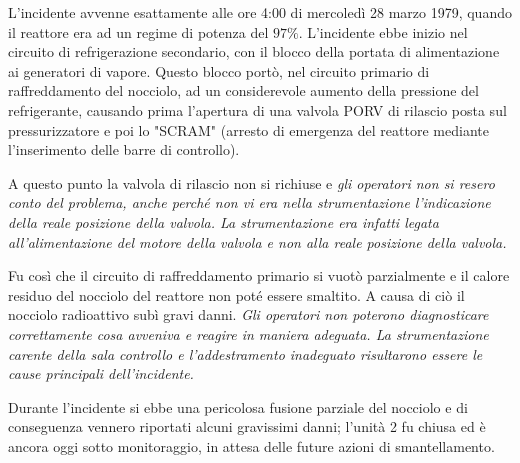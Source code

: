 L'incidente avvenne esattamente alle ore 4:00 di mercoledì 28 marzo 1979, quando il reattore era ad un regime di potenza del $97\%$. L'incidente ebbe inizio nel circuito di refrigerazione secondario, con il blocco della portata di alimentazione ai generatori di vapore. Questo blocco portò, nel circuito primario di raffreddamento del nocciolo, ad un considerevole aumento della pressione del refrigerante, causando prima l'apertura di una valvola PORV di rilascio posta sul pressurizzatore e poi lo "SCRAM" (arresto di emergenza del reattore mediante l'inserimento delle barre di controllo). 

A questo punto la valvola di rilascio non si richiuse e \emph{gli operatori non si resero conto del problema, anche perché non vi era nella strumentazione l'indicazione della reale posizione della valvola. La strumentazione era infatti legata all'alimentazione del motore della valvola e non alla reale posizione della valvola.}

Fu così che il circuito di raffreddamento primario si vuotò parzialmente e il calore residuo del nocciolo del reattore non poté essere smaltito. A causa di ciò il nocciolo radioattivo subì gravi danni. \emph{Gli operatori non poterono diagnosticare correttamente cosa avveniva e reagire in maniera adeguata. La strumentazione carente della sala controllo e l'addestramento inadeguato risultarono essere le cause principali dell'incidente.}

Durante l'incidente si ebbe una pericolosa fusione parziale del nocciolo e di conseguenza vennero riportati alcuni gravissimi danni; l'unità 2 fu chiusa ed è ancora oggi sotto monitoraggio, in attesa delle future azioni di smantellamento.


